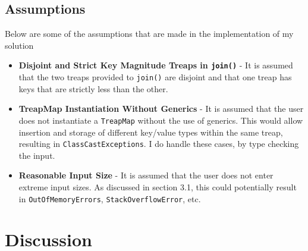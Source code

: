 \documentclass[11pt]{article}
\def\tt{\texttt}
\def\TM{\tt{TreapMap}}
\begin{document}
\subsection{Assumptions}
Below are some of the assumptions that are made in the implementation of my solution
\begin{itemize}
	\item \textbf{Disjoint and Strict Key Magnitude Treaps in \tt{join()}} - It is assumed that the two treaps provided to \tt{join()} are disjoint and that one treap has keys that are strictly less than the other. 
	\item \textbf{TreapMap Instantiation Without Generics} - It is assumed that the user does not instantiate a \TM{} without the use of generics. This would allow insertion and storage of different key/value types within the same treap, resulting in \tt{ClassCastExceptions}. I do handle these cases, by type checking the input. 
	\item \textbf{Reasonable Input Size} - It is assumed that the user does not enter extreme input sizes. As discussed in section 3.1, this could potentially result in \tt{OutOfMemoryErrors}, \tt{StackOverflowError},  etc.
\end{itemize}

\section{Discussion}
\end{document}

